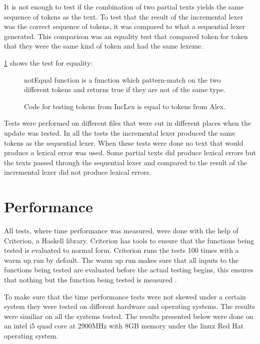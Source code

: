 It is not enough to test if the combination of two partial texts yields the
same sequence of tokens as the text. To test that the result of the incremental
lexer was the correct sequence of tokens, it was compared to what a sequential 
lexer generated. This comparison was an equality test that compared token for
token that they were the same kind of token and had the same lexeme.

\cref{fig:CheckEquility} shows the test for equality:
\begin{figure}[h!]
  \centering
  
  notEqual function is a function which pattern-match on the two different
  tokens and returns true if they are not of the same type.
  \caption{Code for testing tokens from IncLex is equal to tokens from Alex. 
  \label{fig:CheckEquility}}
\end{figure}

Tests were performed on different files that were cut in different places when
the update was tested. In all the tests the incremental lexer produced the same
tokens as the sequential lexer. When these tests were done no text that would
produce a lexical error was used. Some partial texts did produce lexical errors
but the texts passed through the sequential lexer and compared to the result of
the incremental lexer did not produce lexical errors.

\section{Performance}
All tests, where time performance was measured, were done with the help of
Criterion, a Haskell library. Criterion has tools to ensure that the functions
being tested is evaluated to normal form. Criterion runs the tests 100 times
with a warm up run by default. The warm up run makes sure that all inputs to the
functions being tested are evaluated before the actual testing begins, this
ensures that nothing but the function being tested is measured \cite{criterion}.

To make sure that the time performance tests were not skewed under a certain
system they were tested on different hardware and operating systems. The results
were similiar on all the systems tested. The results presented below were done
on an intel i5 quad core at 2900MHz with 8GB memory under the linux Red Hat
operating system.

